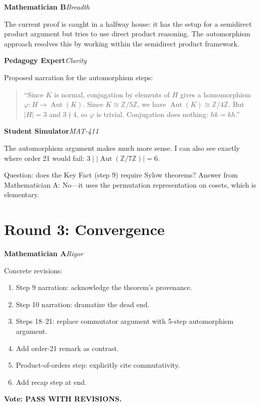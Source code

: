 \documentclass[11pt]{article}
\newcommand{\agent}[3]{%
  \medskip\noindent
  \textcolor{#1}{\textbf{#2}}\hfill\textcolor{#1}{\textit{#3}}\par\smallskip
}
\begin{document}
\bigskip
\agent{breadthgreen}{Mathematician B}{Breadth}

The current proof is caught in a halfway house: it has the setup for a semidirect product argument but tries to use direct product reasoning. The automorphism approach resolves this by working within the semidirect product framework.

\bigskip
\agent{pedorange}{Pedagogy Expert}{Clarity}

Proposed narration for the automorphism steps:
\begin{quote}
``Since $K$ is normal, conjugation by elements of $H$ gives a homomorphism $\varphi\colon H \to \operatorname{Aut}(K)$. Since $K \cong \mathbb{Z}/5\mathbb{Z}$, we have $\operatorname{Aut}(K) \cong \mathbb{Z}/4\mathbb{Z}$. But $|H|=3$ and $3 \nmid 4$, so $\varphi$ is trivial. Conjugation does nothing: $hk = kh$.''
\end{quote}

\bigskip
\agent{studentpurple}{Student Simulator}{MAT-411}

The automorphism argument makes much more sense. I can also see exactly where order 21 would fail: $3 \mid |\!\operatorname{Aut}(\mathbb{Z}/7\mathbb{Z})| = 6$.

Question: does the Key Fact (step 9) require Sylow theorems? Answer from Mathematician A: No---it uses the permutation representation on cosets, which is elementary.

\section{Round 3: Convergence}

\agent{rigorblue}{Mathematician A}{Rigor}

Concrete revisions:
\begin{enumerate}[nosep]
  \item Step 9 narration: acknowledge the theorem's provenance.
  \item Step 10 narration: dramatize the dead end.
  \item Steps 18--21: replace commutator argument with 5-step automorphism argument.
  \item Add order-21 remark as contrast.
  \item Product-of-orders step: explicitly cite commutativity.
  \item Add recap step at end.
\end{enumerate}

\textbf{Vote: PASS WITH REVISIONS.}
\end{document}
